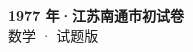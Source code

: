 \documentclass[zihao=-4, a4paper]{ctexart}
\begin{document}
\begin{center}
  {\Large\bfseries 1977 年·江苏南通市初试卷}\\[4pt]
  {\large 数学 · 试题版}
\end{center}
\medskip
{}

\end{document}
